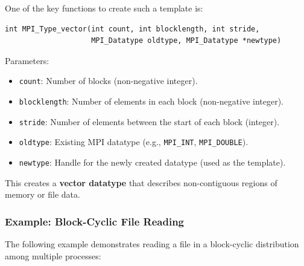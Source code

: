 \documentclass[12pt]{book}
\begin{document}
One of the key functions to create such a template is:

\begin{lstlisting}[style=cppstyle]
int MPI_Type_vector(int count, int blocklength, int stride,
                    MPI_Datatype oldtype, MPI_Datatype *newtype)
\end{lstlisting}
Parameters:
\begin{itemize}
    \item \texttt{count}: Number of blocks (non-negative integer).
    \item \texttt{blocklength}: Number of elements in each block (non-negative integer).
    \item \texttt{stride}: Number of elements between the start of each block (integer).
    \item \texttt{oldtype}: Existing MPI datatype (e.g., \texttt{MPI\_INT}, \texttt{MPI\_DOUBLE}).
    \item \texttt{newtype}: Handle for the newly created datatype (used as the template).
\end{itemize}

This creates a \textbf{vector datatype} that describes non-contiguous regions of memory or file data.

\subsubsection*{Example: Block-Cyclic File Reading}
The following example demonstrates reading a file in a block-cyclic distribution among multiple processes:
\end{document}
